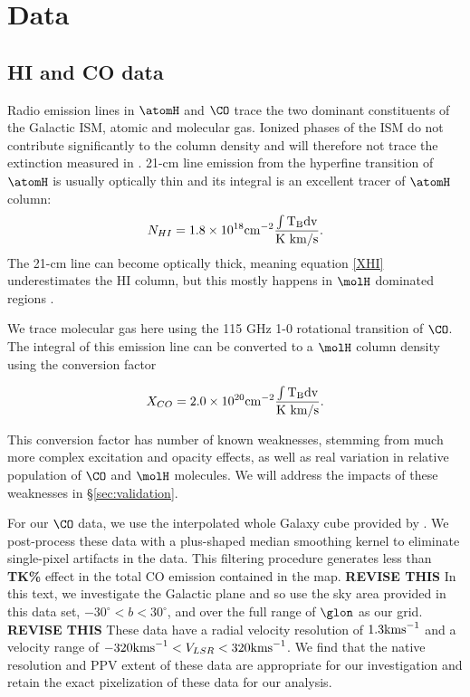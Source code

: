 \section{Data}
\label{sec:data}
\subsection{HI and CO data}

Radio emission lines in $\atomH$ and $\CO$ trace the two dominant constituents of the Galactic ISM, atomic and molecular gas. 
Ionized phases of the ISM do not contribute significantly to the column density and will therefore not trace the extinction measured in \citet{Green_2015}. 
21-cm line emission from the hyperfine transition of $\atomH$ is usually optically thin and its integral is an excellent tracer of $\atomH$ column:
\begin{equation}\label{XHI}
N_{HI} = 1.8 \times 10^{18} \rm cm^{-2} \frac{ \int T_B dv}{\rm K~km/s}.
\end{equation}
The 21-cm line can become optically thick, meaning equation \ref{XHI} underestimates the HI column, but this mostly happens in $\molH$ dominated regions \citep{Goldsmith_2007}. 

We trace molecular gas here using the 115 GHz 1-0 rotational transition of $\CO$. 
The integral of this emission line can be converted to a $\molH$ column density using the conversion factor \citep{Bolatto_2013}

\begin{equation}\label{XCO}
X_{CO} = 2.0 \times 10^{20} \rm cm^{-2} \frac{ \int T_B dv}{\rm K~km/s}.
\end{equation}

This conversion factor has number of known weaknesses, stemming from much more complex excitation and opacity effects, as well as real variation in relative population of $\CO$ and $\molH$ molecules. 
We will address the impacts of these weaknesses in \S \ref{sec:validation}. 

For our $\CO$ data, we use the interpolated whole Galaxy cube provided by \citet{Dame_2001}. 
We post-process these data with a plus-shaped median smoothing kernel to eliminate single-pixel artifacts in the data. 
This filtering procedure generates less than {\bf TK\%} effect in the total CO emission contained in the map. 
{\bf REVISE THIS} In this text, we investigate the Galactic plane and so use the sky area provided in this data set, $-30^\circ < b < 30^\circ$, and over the full range of $\glon$ as our grid. {\bf REVISE THIS}
These data have a radial velocity resolution of $1.3 {\rm km s}^{-1}$ and a velocity range of $-320{\rm km s} ^{-1} < V_{LSR} < 320 \rm{ km s}^{-1}$. 
We find that the native resolution and PPV extent of these data are appropriate for our investigation and retain the exact pixelization of these data for our analysis. 

